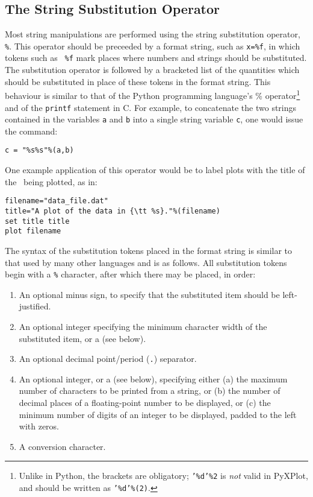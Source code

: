 \subsection{The String Substitution Operator}
\label{sec:stringsubop}

Most string manipulations are performed using the string substitution operator,
{\tt \%}. This operator should be
preceeded by a format string, such as {\tt x=\%f}, in which tokens such as {\tt
\%f} mark places where numbers and strings should be substituted. The
substitution operator is followed by a bracketed list of the quantities which
should be substituted in place of these tokens in the format string. This
behaviour is similar to that of the Python programming language's \%
operator\footnote{Unlike in Python, the brackets are obligatory; {\tt '\%d'\%2}
is {\it not} valid in PyXPlot, and should be written as {\tt '\%d'\%(2)}.} and
of the {\tt printf} statement in C.  For example, to concatenate the two
strings contained in the variables {\tt a} and {\tt b} into a single string
variable {\tt c}, one would issue the command:
\begin{verbatim}
c = "%s%s"%(a,b)
\end{verbatim}

One example application of this operator would be to label plots with the title
of the \datafile\ being plotted, as in:
\begin{verbatim}
filename="data_file.dat"
title="A plot of the data in {\tt %s}."%(filename)
set title title
plot filename
\end{verbatim}

The syntax of the substitution tokens placed in the format string is similar to
that used by many other languages and is as follows. All substitution tokens
begin with a {\tt \%} character, after which there may be placed, in order:

\begin{enumerate}
\item An optional minus sign, to specify that the substituted item should be left-justified.
\item An optional integer specifying the minimum character width of the substituted item, or a {\tt *} (see below).
\item An optional decimal point/period ({\tt .}) separator.
\item An optional integer, or a {\tt *} (see below), specifying either (a) the maximum number of characters to be printed from a string, or (b) the number of decimal places of a floating-point number to be displayed, or (c) the minimum number of digits of an integer to be displayed, padded to the left with zeros.
\item A conversion character.
\end{enumerate}

